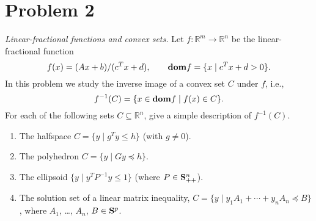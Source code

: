\documentclass{article}
\newcommand{\reals}{{\mathbb{R}}}
\newcommand{\dom}{{\bf{dom}}}
\newcommand{\symm}{{\bf{S}}}
\theoremstyle{definition}
\theoremstyle{definition}
\theoremstyle{remark}
\begin{document}
\section*{Problem 2}\label{e-lin-frac-image}%
\emph{Linear-fractional functions and convex sets.}
Let $f:\reals^m \rightarrow \reals^n$ be the linear-fractional function 
\[
f(x) = (Ax+b)/(c^T x+ d), \qquad \dom f = \{x \;|\; c^Tx+d >0\}.
\]
In this problem we study the inverse image of a convex set $C$ under $f$, i.e.,
\[
f^{-1} (C) = \{ x \in \dom f \;|\; f(x) \in C \}.
\]
For each of the following sets $C\subseteq \reals^n$, give a simple
description of $f^{-1}(C)$.

\begin{enumerate}
\item The halfspace $C = \{ y \; | \; g^Ty \leq h\}$ (with $g\neq 0$).

\item The polyhedron $C = \{y \; | \; Gy \preceq h\}$.

\item The ellipsoid $\{ y \;|\; y^T P^{-1} y \leq 1 \}$ (where $P \in \symm^n_{++}$).

\item The solution set of a linear matrix inequality, $C = \{y\; |\; y_1 A_1+ \cdots + y_n A_n \preceq B\}$, where $A_1$, \ldots, $A_n$, $B \in \symm^p$.
\end{enumerate}
\end{document}
